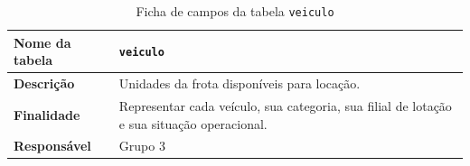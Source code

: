 \begin{table}[!t]
\caption{Ficha de campos da tabela \texttt{veiculo}}
\label{tab:f_veiculo}
\centering
\scriptsize
\setlength{\tabcolsep}{2pt}
\begin{tabular}{|L{3.2cm}|L{14.2cm}|}
\hline
\textbf{Nome da tabela} & \texttt{veiculo} \\
\hline
\textbf{Descri\c{c}\~ao} & Unidades da frota dispon\'iveis para loca\c{c}\~ao. \\
\hline
\textbf{Finalidade} & Representar cada ve\'iculo, sua categoria, sua filial de lota\c{c}\~ao e sua situa\c{c}\~ao operacional. \\
\hline
\textbf{Respons\'avel} & Grupo 3 \\
\hline
\end{tabular}

\vspace{3pt}


\end{table}
